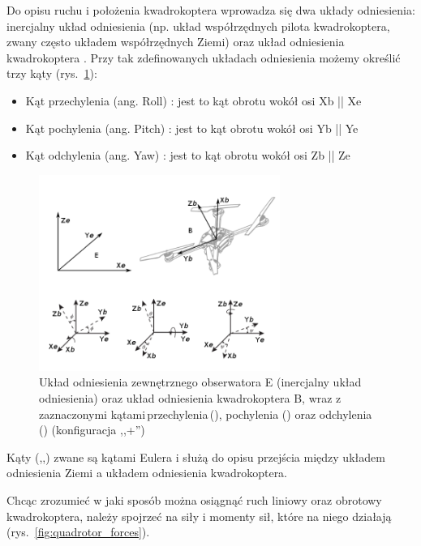 Do opisu ruchu i położenia kwadrokoptera wprowadza się dwa układy odniesienia: inercjalny układ odniesienia (np. układ współrzędnych pilota kwadrokoptera, zwany często układem współrzędnych Ziemi) oraz układ odniesienia kwadrokoptera \cite{quadro4, quadro5}. Przy tak zdefinowanych układach odniesienia możemy określić trzy kąty (rys.~\ref{fig:quadrotor_frames.png}):

\begin{itemize}
	\item Kąt przechylenia (ang. Roll) \straightphi: jest to kąt obrotu wokół osi Xb || Xe
	\item Kąt pochylenia (ang. Pitch) \straighttheta: jest to kąt obrotu wokół osi Yb || Ye 
	\item Kąt odchylenia (ang. Yaw) \textpsi: jest to kąt obrotu wokół osi Zb || Ze
\end{itemize}

\begin{figure}[!htb]
	\centering
		\includegraphics[width=0.7\textwidth]{Pictures/quadrotor_frames.png}
		\caption[Układy odniesienia]{Układ odniesienia zewnętrznego obserwatora E (inercjalny układ odniesienia) oraz układ odniesienia kwadrokoptera B, wraz z zaznaczonymi kątami\,przechylenia\,(\straightphi), pochylenia (\straighttheta) oraz odchylenia (\textpsi) (konfiguracja ,,+'')~\cite{quadro6}}
	\label{fig:quadrotor_frames.png}
\end{figure}

Kąty (\straightphi,\straighttheta,\textpsi) zwane są kątami Eulera i służą do opisu przejścia między układem odniesienia Ziemi a układem odniesienia kwadrokoptera.

Chcąc zrozumieć w jaki sposób można osiągnąć ruch liniowy oraz obrotowy kwadrokoptera, należy spojrzeć na siły i momenty sił, które na niego działają (rys.~\ref{fig:quadrotor_forces}). 


